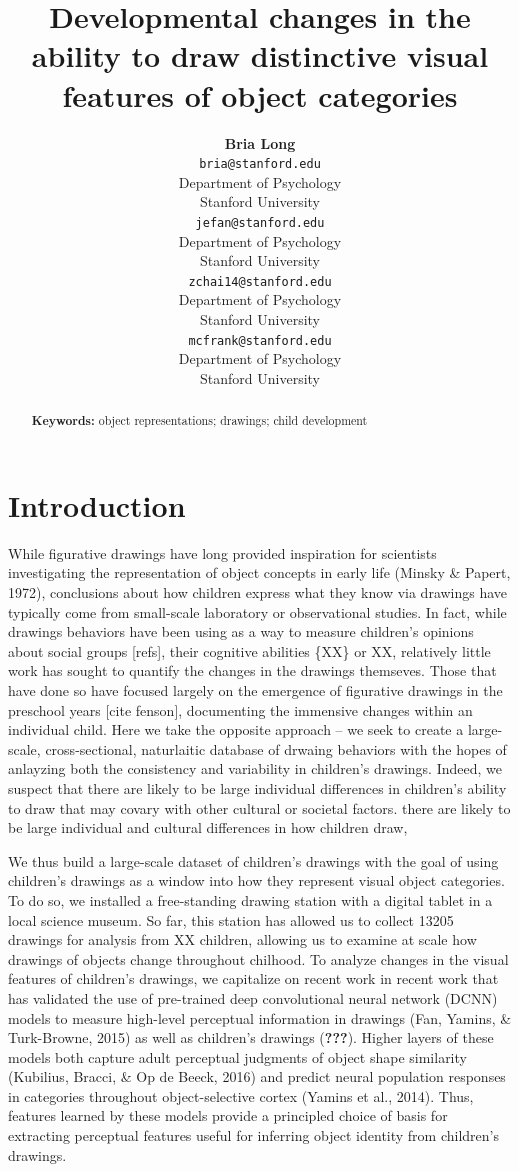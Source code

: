 \documentclass[10pt, letterpaper]{article}
\title{Developmental changes in the ability to draw distinctive visual features
of object categories}
\author{{\large \bf Bria Long} \\ \texttt{bria@stanford.edu} \\ Department of Psychology \\ Stanford University \And {\large \bf Judith E. Fan} \\ \texttt{jefan@stanford.edu} \\ Department of Psychology \\ Stanford University \And {\large \bf Zixian Chai} \\ \texttt{zchai14@stanford.edu} \\ Department of Psychology \\ Stanford University \And {\large \bf Michael C. Frank } \\ \texttt{mcfrank@stanford.edu} \\ Department of Psychology \\ Stanford University}
\begin{document}
\maketitle

\begin{abstract}


\textbf{Keywords:}
object representations; drawings; child development
\end{abstract}

\newcommand{\wrapmf}[1]{#1} 





\section{Introduction}\label{introduction}

While figurative drawings have long provided inspiration for scientists
investigating the representation of object concepts in early life
(Minsky \& Papert, 1972), conclusions about how children express what
they know via drawings have typically come from small-scale laboratory
or observational studies. In fact, while drawings behaviors have been
using as a way to measure children's opinions about social groups
{[}refs{]}, their cognitive abilities \{XX\} or XX, relatively little
work has sought to quantify the changes in the drawings themseves. Those
that have done so have focused largely on the emergence of figurative
drawings in the preschool years {[}cite fenson{]}, documenting the
immensive changes within an individual child. Here we take the opposite
approach -- we seek to create a large-scale, cross-sectional,
naturlaitic database of drwaing behaviors with the hopes of anlayzing
both the consistency and variability in children's drawings. Indeed, we
suspect that there are likely to be large individual differences in
children's ability to draw that may covary with other cultural or
societal factors. there are likely to be large individual and cultural
differences in how children draw,

We thus build a large-scale dataset of children's drawings with the goal
of using children's drawings as a window into how they represent visual
object categories. To do so, we installed a free-standing drawing
station with a digital tablet in a local science museum. So far, this
station has allowed us to collect 13205 drawings for analysis from XX
children, allowing us to examine at scale how drawings of objects change
throughout chilhood. To analyze changes in the visual features of
children's drawings, we capitalize on recent work in recent work that
has validated the use of pre-trained deep convolutional neural network
(DCNN) models to measure high-level perceptual information in drawings
(Fan, Yamins, \& Turk-Browne, 2015) as well as children's drawings
({\textbf{???}}). Higher layers of these models both capture adult
perceptual judgments of object shape similarity (Kubilius, Bracci, \& Op
de Beeck, 2016) and predict neural population responses in categories
throughout object-selective cortex (Yamins et al., 2014). Thus, features
learned by these models provide a principled choice of basis for
extracting perceptual features useful for inferring object identity from
children's drawings.
\end{document}
